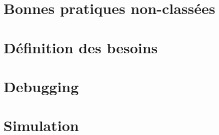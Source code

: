 
\section{Bonnes pratiques non-classées}

\section{Définition des besoins}


\section{Debugging}

\section{Simulation}
